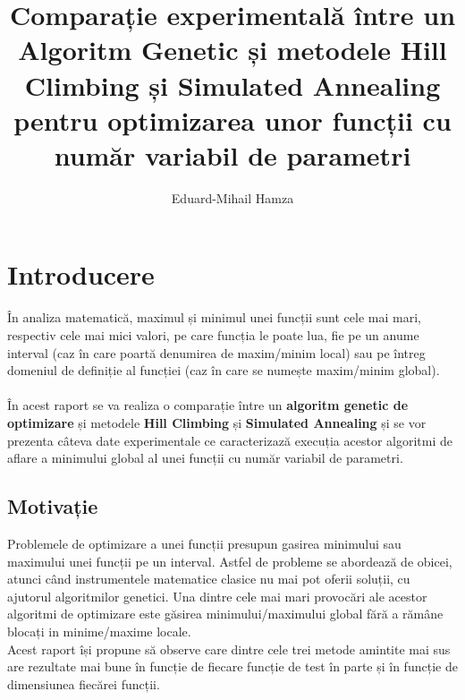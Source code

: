 \documentclass{article}
\author{Eduard-Mihail Hamza}
\title{Comparație experimentală între un Algoritm Genetic și metodele Hill Climbing și Simulated Annealing pentru optimizarea unor funcții cu număr variabil de parametri}
\begin{document}
\maketitle

\section{Introducere}

În analiza matematică, maximul și minimul unei funcții sunt cele mai mari, respectiv cele mai mici valori, pe care funcția le poate lua, fie pe un anume interval (caz în care poartă denumirea de maxim/minim local) sau pe întreg domeniul de definiție al funcției (caz în care se numește maxim/minim global).\\ \\
În acest raport se va realiza o comparație între un \textbf{algoritm genetic de optimizare} și metodele \textbf{Hill Climbing} și \textbf{Simulated Annealing} și se vor prezenta câteva date experimentale ce caracterizază execuția acestor algoritmi de aflare a minimului global al unei funcții cu număr variabil de parametri.

 
\subsection{Motivație}
Problemele de optimizare a unei funcții presupun gasirea minimului sau maximului unei funcții pe un interval. Astfel de probleme se abordează de obicei, atunci când instrumentele matematice clasice nu mai pot oferii soluții, cu ajutorul algoritmilor genetici. Una dintre cele mai mari provocări ale acestor algoritmi de optimizare este găsirea minimului/maximului global fără a rămâne blocați in minime/maxime locale.\\
Acest raport își propune să observe care dintre cele trei metode amintite mai sus are rezultate mai bune în funcție de fiecare funcție de test în parte și în funcție de dimensiunea fiecărei funcții.
\end{document}
